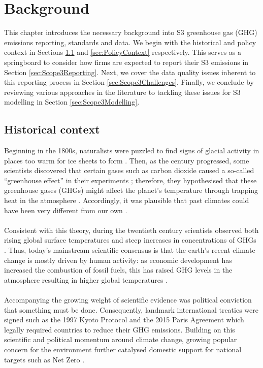 \documentclass[12pt,twoside]{report}
\begin{document}
\chapter{Background} \label{sec:ChapterBackground}

This chapter introduces the necessary background into S3 greenhouse gas (GHG) emissions reporting, standards and data. We begin with the historical and policy context in Sections \ref{sec:HistoricalContext} and \ref{sec:PolicyContext} respectively. This serves as a springboard to consider how firms are expected to report their S3 emissions in Section \ref{sec:Scope3Reporting}. Next, we cover the data quality issues inherent to this reporting process in Section \ref{sec:Scope3Challenges}. Finally, we conclude by reviewing various approaches in the literature to tackling these issues for S3 modelling in Section \ref{sec:Scope3Modelling}. 

\section{Historical context}\label{sec:HistoricalContext}
Beginning in the 1800s, naturalists were puzzled to find signs of glacial activity in places too warm for ice sheets to form \cite{young1995}. Then, as the century progressed, some scientists discovered that certain gases such as carbon dioxide caused a so-called ``greenhouse effect'' in their experiments \cite{Ekholm1901}; therefore, they hypothesised that these greenhouse gases (GHGs) might affect the planet's temperature through trapping heat in the atmosphere \cite{Arrhenius1896}. Accordingly, it was plausible that past climates could have been very different from our own \cite{foote1856}. 
\\\\
Consistent with this theory, during the twentieth century scientists observed both rising global surface temperatures and steep increases in concentrations of GHGs \cite{Sawyer1972}. Thus, today's mainstream scientific consensus is that the earth's recent climate change is mostly driven by human activity: as economic development has increased the combustion of fossil fuels, this has raised GHG levels in the atmosphere resulting in higher global temperatures \cite{IPCC2021, RS2020}. 
\\\\
Accompanying the growing weight of scientific evidence was political conviction that something must be done. Consequently, landmark international treaties were signed such as the 1997 Kyoto Protocol \cite{UN1997} and the 2015 Paris Agreement \cite{UNFCCC2020} which legally required countries to reduce their GHG emissions. Building on this scientific and political momentum around climate change, growing popular concern for the environment further catalysed domestic support for national targets such as Net Zero \cite{Poortinga2023}. 
\end{document}
